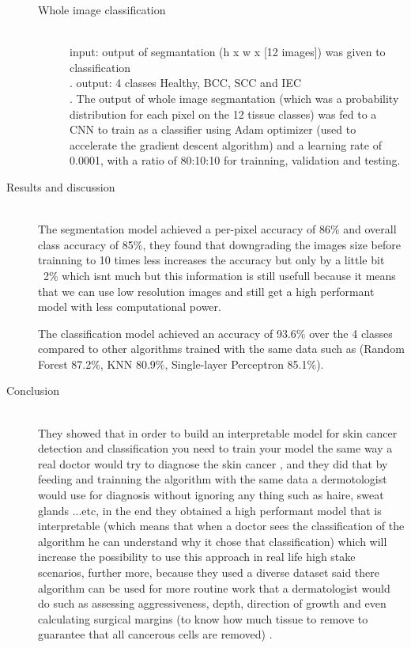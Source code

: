 \begin{description}
\begin{description}
    \item[Whole image classification] \hfill \\

        input: output of segmantation (h x w x [12 images]) was given to classification \hfill \\.
        output: 4 classes Healthy, BCC, SCC and IEC \hfill \\.
        The output of whole image segmantation (which was a probability distribution for each pixel on the 12 tissue classes) was fed to a CNN to train as a classifier using Adam optimizer (used to accelerate the gradient descent algorithm) and a learning rate of 0.0001, with a ratio of 80:10:10 for trainning, validation and testing.
    \end{description}


\item[Results and discussion] \hfill \\
    The segmentation model achieved a per-pixel accuracy of 86\% and overall class accuracy of 85\%, they found that downgrading the images size before trainning to 10 times less increases the accuracy but only by a little bit ~2\% which isnt much but this information is still usefull because it means that we can use low resolution images and still get a high performant model with less computational power.

    The classification model achieved an accuracy of 93.6\% over the 4 classes compared to other algorithms trained with the same data such as (Random Forest 87.2\%, KNN 80.9\%, Single-layer Perceptron 85.1\%).


\item[Conclusion] \hfill \\
    They showed that in order to build an interpretable model for skin cancer detection and classification you need to train your model the same way a real doctor would try to diagnose the skin cancer , and they did that by feeding and trainning the algorithm with the same data a dermotologist would use for diagnosis without ignoring any thing such as haire, sweat glands ...etc, in the end they obtained a high performant model that is interpretable (which means that when a doctor sees the classification of the algorithm he can understand why it chose that classification) which will increase the possibility to use this approach in real life high stake scenarios, further more, because they used a diverse dataset said there algorithm can be used for more routine work that a dermatologist would do such as assessing aggressiveness, depth, direction of growth and even calculating surgical margins (to know how much tissue to remove to guarantee that all cancerous cells are removed) .
\end{description}



